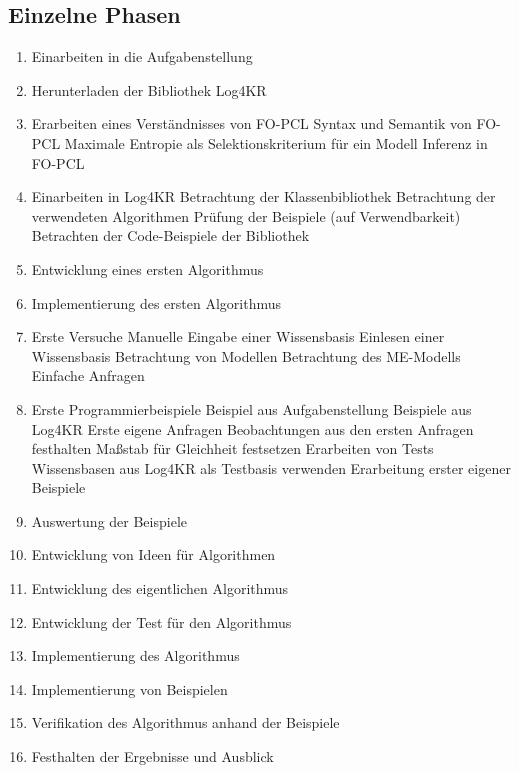 \documentclass[draft]{scrreprt}
\begin{document}
\subsection{Einzelne Phasen}

\begin{enumerate}
	\item Einarbeiten in die Aufgabenstellung
	\item Herunterladen der Bibliothek Log4KR
	\item Erarbeiten eines Verständnisses von FO-PCL
	\subitem Syntax und Semantik von FO-PCL
	\subitem Maximale Entropie als Selektionskriterium für ein Modell
	\subitem Inferenz in FO-PCL
	\item Einarbeiten in Log4KR
	\subitem Betrachtung der Klassenbibliothek 
	\subitem Betrachtung der verwendeten Algorithmen
	\subitem Prüfung der Beispiele (auf Verwendbarkeit)
	\subitem Betrachten der Code-Beispiele der Bibliothek
	\item Entwicklung eines ersten Algorithmus
	\item Implementierung des ersten Algorithmus
	\item Erste Versuche 
	\subitem Manuelle Eingabe einer Wissensbasis
	\subitem Einlesen einer Wissensbasis
	\subitem Betrachtung von Modellen
	\subitem Betrachtung des ME-Modells
	\subitem Einfache Anfragen
	\item Erste Programmierbeispiele
	\subitem Beispiel aus Aufgabenstellung
	\subitem Beispiele aus Log4KR
	\subitem Erste eigene Anfragen
	\subitem Beobachtungen aus den ersten Anfragen festhalten
	\subitem Maßstab für Gleichheit festsetzen 
	\subitem Erarbeiten von Tests
	\subitem Wissensbasen aus Log4KR als Testbasis verwenden
	\subitem Erarbeitung erster eigener Beispiele
	\item Auswertung der Beispiele
	\item Entwicklung von Ideen für Algorithmen
	\item Entwicklung des eigentlichen Algorithmus
	\item Entwicklung der Test für den Algorithmus 
	\item Implementierung des Algorithmus
	\item Implementierung von Beispielen 
	\item Verifikation des Algorithmus anhand der Beispiele
	\item Festhalten der Ergebnisse und Ausblick
	
\end{enumerate}
\end{document}
